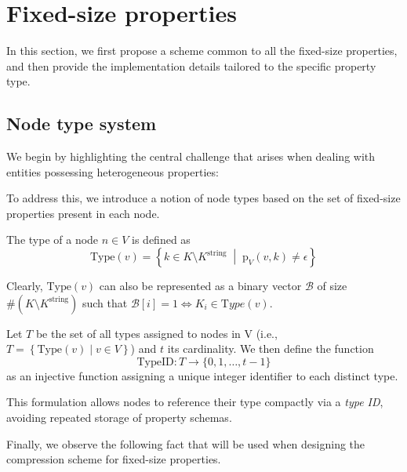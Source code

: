 \section{Fixed-size properties}
\label{sec:fixedsizeprop}

In this section, we first propose a scheme common to all the fixed-size properties, and then provide the implementation details tailored to the specific property type.


\subsection{Node type system}
We begin by highlighting the central challenge that arises when dealing with entities possessing heterogeneous properties:


To address this, we introduce a notion of node types based on the set of fixed-size properties present in each node.

\begin{definition}
The type of a node \( n \in V \) is defined as
\[
\mathrm {Type}(v) = \left\{ k \in K \setminus K^{\text{string}} \; \middle| \; \mathrm p_V(v, k) \ne \epsilon \right\}
\]
\end{definition}
Clearly, $\mathrm{Type}(v)$ can also be represented as a binary vector $\mathcal B$ of size $\#(K \setminus K^\text{string})$ such that $\mathcal{B}[i] = 1 \iff K_i \in \mathrm Type(v)$.

\begin{definition}
Let $T$ be the set of all types assigned to nodes in V (i.e., 
$T = \left\{ \mathrm{Type}(v) \mid v \in V \right\}$) and $t$ its cardinality. We then define the function
\[
\mathrm{TypeID} : T \rightarrow \{0, 1, \dots, t - 1\}
\]
as an injective function assigning a unique integer identifier to each distinct type.
\end{definition}
This formulation allows nodes to reference their type compactly via a \emph{type ID}, avoiding repeated storage of property schemas.

Finally, we observe the following fact that will be used when designing the compression scheme for fixed-size properties.


